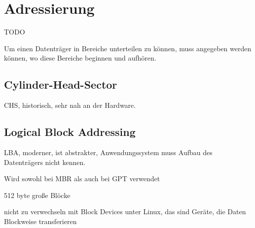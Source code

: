 \section{Adressierung}
TODO

Um einen Datenträger in Bereiche unterteilen zu können, muss angegeben werden können, wo diese Bereiche beginnen und aufhören.

\subsection{Cylinder-Head-Sector}
CHS, historisch, sehr nah an der Hardware.

\subsection{Logical Block Addressing}
LBA, moderner, ist abstrakter, Anwendungssystem muss Aufbau des Datenträgers nicht kennen.

Wird sowohl bei MBR als auch bei GPT verwendet

512 byte große Blöcke

nicht zu verwechseln mit Block Devices unter Linux, das sind Geräte, die Daten Blockweise transferieren

